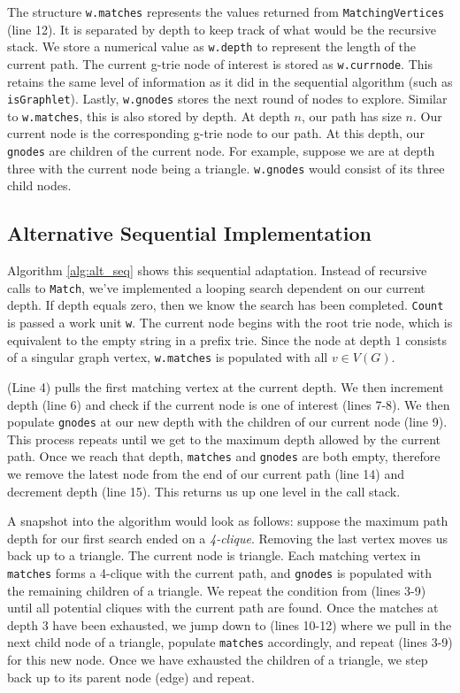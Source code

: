 \documentclass[12pt,twoside]{reedthesis}
\begin{document}
The structure \texttt{w.matches} represents the values returned from \texttt{MatchingVertices} (line 12). It is separated by depth to keep track of what would be the recursive stack. We store a numerical value as \texttt{w.depth} to represent the length of the current path. The current g-trie node of interest is stored as \texttt{w.currnode}. This retains the same level of information as it did in the sequential algorithm (such as \texttt{isGraphlet}). Lastly, \texttt{w.gnodes} stores the next round of nodes to explore. Similar to \texttt{w.matches}, this is also stored by depth. At depth $n$, our path has size $n$. Our current node is the corresponding g-trie node to our path. At this depth, our \texttt{gnodes} are children of the current node. For example, suppose we are at depth three with the current node being a triangle. \texttt{w.gnodes} would consist of its three child nodes.
\subsection{Alternative Sequential Implementation}

Algorithm \ref{alg:alt_seq} shows this sequential adaptation. Instead of recursive calls to \texttt{Match}, we've implemented a looping search dependent on our current depth. If depth equals zero, then we know the search has been completed. \texttt{Count} is passed a work unit \texttt{w}. The current node begins with the root trie node, which is equivalent to the empty string in a prefix trie. Since the node at depth $1$ consists of a singular graph vertex, \texttt{w.matches} is populated with all $v \in V(G)$. 

(Line 4) pulls the first matching vertex at the current depth. We then increment depth (line 6)  and check if the current node is one of interest (lines 7-8). We then populate \texttt{gnodes} at our new depth with the children of our current node (line 9). This process repeats until we get to the maximum depth allowed by the current path. Once we reach that depth, \texttt{matches} and \texttt{gnodes} are both empty, therefore we remove the latest node from the end of our current path (line 14) and decrement depth (line 15). This returns us up one level in the call stack.

A snapshot into the algorithm would look as follows: suppose the maximum path depth for our first search ended on a \textit{4-clique}. Removing the last vertex moves us back up to a triangle. The current node is triangle. Each matching vertex in \texttt{matches} forms a 4-clique with the current path, and \texttt{gnodes} is populated with the remaining children of a triangle. We repeat the condition from (lines 3-9) until all potential cliques with the current path are found. Once the matches at depth $3$ have been exhausted, we jump down to (lines 10-12) where we pull in the next child node of a triangle, populate \texttt{matches} accordingly, and repeat (lines 3-9) for this new node. Once we have exhausted the children of a triangle, we step back up to its parent node (edge) and repeat.
\end{document}
